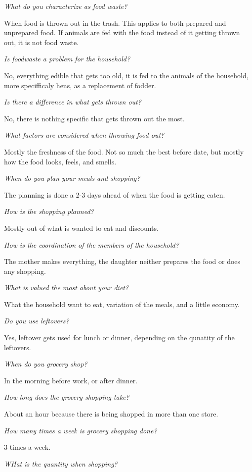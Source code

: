\emph{What do you characterize as food waste?}

When food is thrown out in the trash. This applies to both prepared and unprepared food. If animals are fed with the food instead of it getting thrown out, it is not food waste.

\emph{Is foodwaste a problem for the household?}

No, everything edible that gets too old, it is fed to the animals of the household, more specifficaly hens, as a replacement of fodder.

\emph{Is there a difference in what gets thrown out?}

No, there is nothing specific that gets thrown out the most.

\emph{What factors are considered when throwing food out?}

Mostly the freshness of the food. Not so much the best before date, but mostly how the food looks, feels, and smells.

\emph{When do you plan your meals and shopping?}

The planning is done a 2-3 days ahead of when the food is getting eaten.

\emph{How is the shopping planned?}

Mostly out of what is wanted to eat and discounts.

\emph{How is the coordination of the members of the household?}

The mother makes everything, the daughter neither prepares the food or does any shopping.

\emph{What is valued the most about your diet?}

What the household want to eat, variation of the meals, and a little economy.

\emph{Do you use leftovers?}

Yes, leftover gets used for lunch or dinner, depending on the qunatity of the leftovers.

\emph{When do you grocery shop?}

In the morning before work, or after dinner.

\emph{How long does the grocery shopping take?}

About an hour because there is being shopped in more than one store.

\emph{How many times a week is grocery shopping done?}

3 times a week.

\emph{WHat is the quantity when shopping?}

